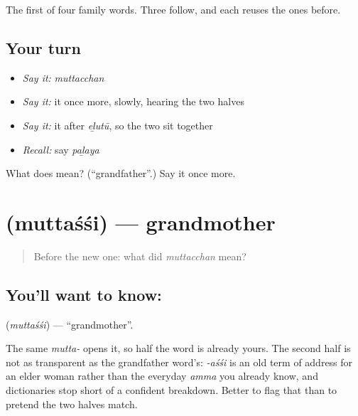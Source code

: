 \begin{grammarlens}[title={What you've built}]
The first of four family words. Three follow, and each reuses the ones before.
\end{grammarlens}

\subsection*{Your turn}
\begin{itemize}
\raggedright
  \item \emph{Say it:} \emph{muttacchan}
  \item \emph{Say it:} it once more, slowly, hearing the two halves
  \item \emph{Say it:} it after \emph{eḻutū}, so the two sit together
  \item \emph{Recall:} say \emph{paḻaya}
\end{itemize}

\begin{tcolorbox}[breakable,colback=teal!4,colframe=teal!35!black,title={Before you move on}]
What does  mean? (\textquotedblleft{}grandfather\textquotedblright{}.) Say it once more.
\end{tcolorbox}
\section[\texorpdfstring{\ml{മുത്തശ്ശി} (muttaśśi)}{മുത്തശ്ശി (muttaśśi)}]{ (muttaśśi) — grandmother}

\label{lesson:ML-C45-grandmother}



\begin{quote}
Before the new one: what did \emph{muttacchan} mean?
\end{quote}

\subsection*{You'll want to know: }
\textbf{} (\emph{muttaśśi}) — \textquotedblleft{}grandmother\textquotedblright{}.

The same \emph{mutta-} opens it, so half the word is already yours. The second half is not as transparent as the grandfather word's: \emph{-aśśi} is an old term of address for an elder woman rather than the everyday \emph{amma} you already know, and dictionaries stop short of a confident breakdown. Better to flag that than to pretend the two halves match.

